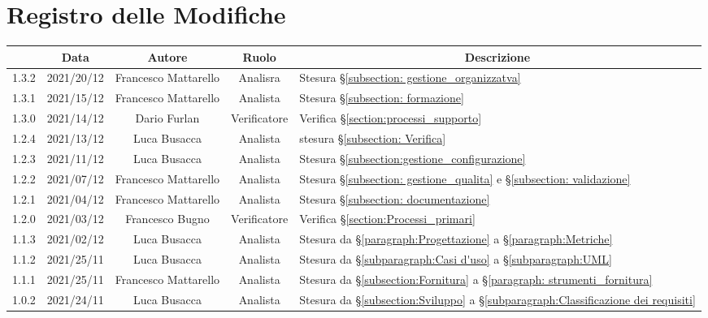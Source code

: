 \thispagestyle{empty}
\section*{Registro delle Modifiche}

\begin{center}
	\renewcommand{\arraystretch}{1.8}
	\begin{longtable}[c]{c | c | c | c | p{5cm}}
		\rowcolor[HTML]{125E28}
		\multicolumn{1}{c}{\color[HTML]{FFFFFF} \textbf{Versione}} & 
		\multicolumn{1}{c}{\color[HTML]{FFFFFF} \textbf{Data}} & 
		\multicolumn{1}{c}{\color[HTML]{FFFFFF} \textbf{Autore}} & 
		\multicolumn{1}{c}{\color[HTML]{FFFFFF} \textbf{Ruolo}} & 
		\multicolumn{1}{c}{\color[HTML]{FFFFFF} \textbf{Descrizione}} \\
		\endhead
		1.3.2 & 2021/20/12 & Francesco Mattarello & Analisra & Stesura §\ref{subsection: gestione_organizzatva}\\
		1.3.1 & 2021/15/12 & Francesco Mattarello & Analista & Stesura §\ref{subsection: formazione}\\
		1.3.0 & 2021/14/12 & Dario Furlan & Verificatore & Verifica §\ref{section:processi_supporto}\\
		1.2.4 & 2021/13/12 & Luca Busacca & Analista & stesura §\ref{subsection: Verifica}\\
		1.2.3 & 2021/11/12 & Luca Busacca & Analista & Stesura  §\ref{subsection:gestione_configurazione} \\
		1.2.2 & 2021/07/12 & Francesco Mattarello & Analista & Stesura §\ref{subsection: gestione_qualita} e §\ref{subsection: validazione}\\
		1.2.1 & 2021/04/12 & Francesco Mattarello & Analista & Stesura §\ref{subsection: documentazione}\\
		1.2.0 & 2021/03/12 & Francesco Bugno & Verificatore & Verifica §\ref{section:Processi_primari} \\
		1.1.3 & 2021/02/12 & Luca Busacca & Analista & Stesura da  §\ref{paragraph:Progettazione} a §\ref{paragraph:Metriche} \\
		1.1.2 & 2021/25/11 & Luca Busacca & Analista & Stesura da  §\ref{subparagraph:Casi d'uso} a §\ref{subparagraph:UML} \\
		1.1.1 & 2021/25/11 & Francesco Mattarello & Analista & Stesura da §\ref{subsection:Fornitura} a §\ref{paragraph: strumenti_fornitura} \\
		1.0.2 & 2021/24/11 & Luca Busacca & Analista & Stesura da §\ref{subsection:Sviluppo} a  §\ref{subparagraph:Classificazione dei requisiti} \\

\end{longtable}
\end{center}
